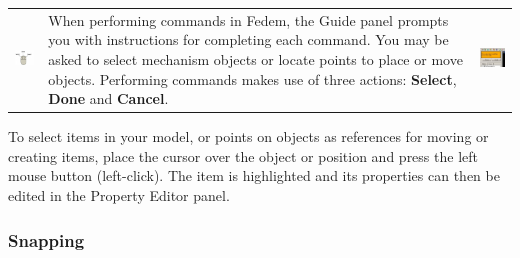 
\hskip-33mm
\begin{minipage}{1.4\textwidth}
  \begin{tabular}{p{} p{} p{}}
    \vspace{0pt} \includegraphics[width=25mm]{Figures/2-mousebuttons} &
    \vspace{0pt} \raggedright
    When performing commands in Fedem, the Guide panel prompts you
    with instructions for completing each command. You may be asked to select
    mechanism objects or locate points to place or move objects.
    Performing commands makes use of three actions:
    \textbf{Select}, \textbf{Done} and \textbf{Cancel}. &
    \vspace{0pt} \includegraphics[width=32mm]{Figures/2-Guide}
  \end{tabular}
\end{minipage}


To select items in your model, or points on objects as references for
moving or creating items, place the cursor over the object or position
and press the left mouse button (left-click). The item is highlighted
and its properties can then be edited in the Property Editor panel.



\subsubsection{Snapping}

